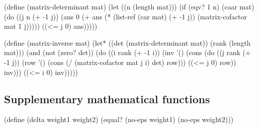 \documentclass[a4paper,10pt]{article}%
\theoremstyle{definition} \newtheorem{Def}{Definition}
\begin{document}
(define (matrix-determinant mat)
  (let ((n (length mat)))
    (if (eqv? 1 n) (caar mat)
        (do ((j n (+ -1 j))
             (ans 0 (+ ans (* (list-ref (car mat) (+ -1 j))
                              (matrix-cofactor mat 1 j)))))
            ((<= j 0) ans)))))


(define (matrix-inverse mat)
  (let* ((det (matrix-determinant mat))
         (rank (length mat)))
    (and (not (zero? det))
         (do ((i rank (+ -1 i))
              (inv '() (cons
                        (do ((j rank (+ -1 j))
                             (row '()
                                  (cons (/ (matrix-cofactor mat j i) det) row)))
                            ((<= j 0) row))
                        inv)))
             ((<= i 0) inv)))))

\nwendcode{}\nwdocspar

\subsection{Supplementary mathematical functions}
\label{sec:suppl-math-funct}

\nwenddocs{}\endmoddef\nwstartdeflinemarkup\nwenddeflinemarkup

(define (delta weight1 weight2)
  (equal? (no-eps weight1) (no-eps weight2)))
\nwendcode{}
\end{document}
